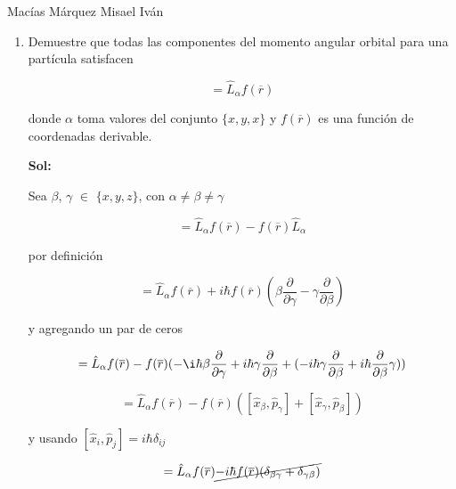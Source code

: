 \documentclass[12pt,a4paper]{article}
\begin{document}
Macías Márquez Misael Iván

\begin{enumerate}








\item Demuestre que todas las componentes del momento angular orbital para una partícula satisfacen 

\begin{equation*}
    [ \hat{L}_{\alpha}, f(\overline{r})] = \hat{L}_{\alpha} f(\overline{r}) 
\end{equation*}

donde $\alpha$ toma valores del conjunto  $\{x,y,x\}$ y $f(\overline{r})$ es una función de coordenadas derivable.

\textbf{Sol:}

Sea $\beta$, $\gamma$ $\in$ $\{x,y,z\}$, con $\alpha \neq \beta \neq  \gamma$

\begin{equation*}
    [\hat{L}_\alpha, f(\overline{r})] = \hat{L}_\alpha f(\overline{r}) - f(\overline{r}) \hat{L}_\alpha
\end{equation*}

por definición

\begin{equation*}
    [\hat{L}_\alpha , f(\overline{r})] = \hat{L}_\alpha f(\overline{r}) + i \hbar f(\overline{r}) (\beta\frac{\partial }{\partial \gamma} - \gamma \frac{\partial}{\partial \beta})
\end{equation*}

y agregando un par de ceros

\begin{equation*}
    [\hat{L}_\alpha , f(\overline{r})] = \hat{L}_\alpha f(\overline{r})- f(\overline{r}) (- \i \hbar\beta\frac{\partial }{\partial \gamma} + i \hbar \gamma \frac{\partial}{\partial \beta} + (-i\hbar\gamma \frac{\partial}{\partial \beta}  + i \hbar \frac{\partial}{\partial \beta} \gamma))
\end{equation*}

\begin{equation*}
    =\hat{L}_\alpha f(\overline{r}) - f(\overline{r}) ([\hat{x}_\beta,\hat{p}_\gamma] + [\hat{x}_\gamma, \hat{p}_\beta] )
\end{equation*}

y usando $[\hat{x}_i, \hat{p}_j] = i \hbar \delta_{ij}$

\begin{equation*}
    [\hat{L}_\alpha , f(\overline{r})] = \hat{L}_\alpha f(\overline{r}) \cancel{-i \hbar f(\overline{r}) (\delta_{\beta \gamma} + \delta_{\gamma \beta} )}
\end{equation*}


\end{enumerate}
\end{document}
